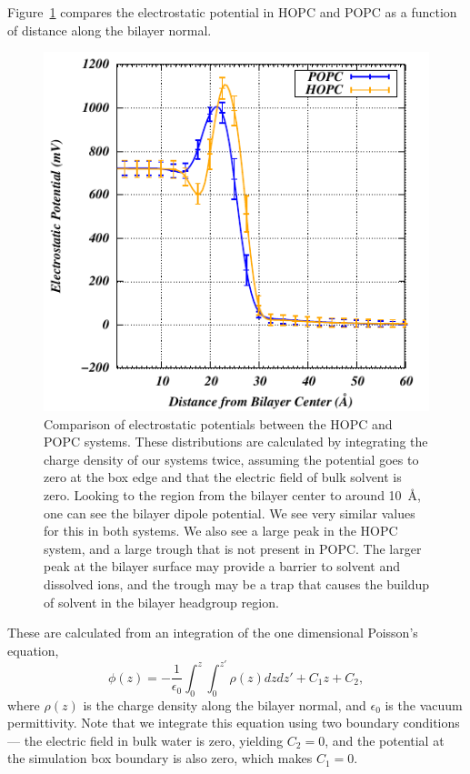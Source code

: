 \documentclass[12pt,openany,final]{book}
\begin{document}
Figure~\ref{fig:epot} compares the electrostatic potential in HOPC and POPC 
as a function of distance along the bilayer normal. 
\begin{figure}[p]
    \caption[Comparison of electrostatic potentials between the HOPC and POPC systems.]{ 
Comparison of electrostatic potentials between the HOPC and POPC systems. 
These distributions are calculated by integrating the charge density of our systems twice, assuming the potential goes 
to zero at the box edge and that the electric field of bulk solvent is zero. 
Looking to the region from the bilayer center to around 10~\AA, one can see 
the bilayer dipole potential. We see very similar values for this in 
both systems. We also see a large peak in the HOPC system, 
and a large trough that is not present in POPC. The larger peak at the bilayer surface may provide a barrier to  
solvent and dissolved ions, and the trough may be a trap that causes the buildup of solvent in the bilayer headgroup region. }
\label{fig:epot}
\includegraphics[width=\textwidth]{potential}
\end{figure}
These are calculated from an integration of the one dimensional Poisson's equation,
\begin{equation}
\label{eq:poissonint}
\phi(z)=-\frac{1}{\epsilon_0}\int_{0}^{z}\int_{0}^{z'}\rho(z) dz dz' + C_1z + C_2,
\end{equation}
where $\rho(z)$ is the charge density along the bilayer normal, and $\epsilon_0$ is the 
vacuum permittivity. Note that we integrate this equation using two boundary 
conditions --- the electric field in bulk water is zero, yielding $C_2=0$, and 
the potential at the simulation box boundary is also zero, which makes $C_1=0$.
\end{document}
